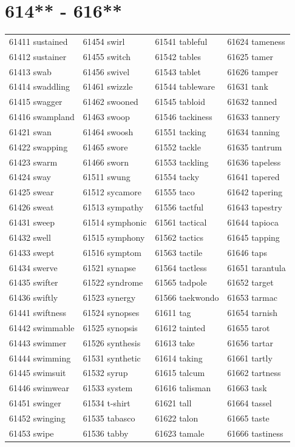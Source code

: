 \documentclass[10pt, oneside]{book}
\begin{document}
\begin{table}
	\centering
	\section*{614** - 616**}
	\begin{tabular}{l l l l}
61411 sustained &61454 swirl &61541 tableful &61624 tameness\\
61412 sustainer &61455 switch &61542 tables &61625 tamer\\
61413 swab &61456 swivel &61543 tablet &61626 tamper\\
61414 swaddling &61461 swizzle &61544 tableware &61631 tank\\
61415 swagger &61462 swooned &61545 tabloid &61632 tanned\\
61416 swampland &61463 swoop &61546 tackiness &61633 tannery\\
61421 swan &61464 swoosh &61551 tacking &61634 tanning\\
61422 swapping &61465 swore &61552 tackle &61635 tantrum\\
61423 swarm &61466 sworn &61553 tackling &61636 tapeless\\
61424 sway &61511 swung &61554 tacky &61641 tapered\\
61425 swear &61512 sycamore &61555 taco &61642 tapering\\
61426 sweat &61513 sympathy &61556 tactful &61643 tapestry\\
61431 sweep &61514 symphonic &61561 tactical &61644 tapioca\\
61432 swell &61515 symphony &61562 tactics &61645 tapping\\
61433 swept &61516 symptom &61563 tactile &61646 taps\\
61434 swerve &61521 synapse &61564 tactless &61651 tarantula\\
61435 swifter &61522 syndrome &61565 tadpole &61652 target\\
61436 swiftly &61523 synergy &61566 taekwondo &61653 tarmac\\
61441 swiftness &61524 synopses &61611 tag &61654 tarnish\\
61442 swimmable &61525 synopsis &61612 tainted &61655 tarot\\
61443 swimmer &61526 synthesis &61613 take &61656 tartar\\
61444 swimming &61531 synthetic &61614 taking &61661 tartly\\
61445 swimsuit &61532 syrup &61615 talcum &61662 tartness\\
61446 swimwear &61533 system &61616 talisman &61663 task\\
61451 swinger &61534 t-shirt &61621 tall &61664 tassel\\
61452 swinging &61535 tabasco &61622 talon &61665 taste\\
61453 swipe &61536 tabby &61623 tamale &61666 tastiness\\
	\end{tabular}
 \end{table}
\clearpage
\end{document}
